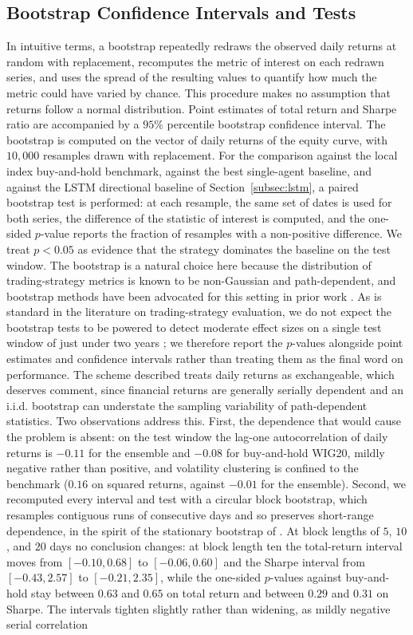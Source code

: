 \documentclass{ieeeaccess}
\newcommand{\TRtestCIlow}{\ensuremath{-0.10}}
\newcommand{\TRtestCIhigh}{\ensuremath{0.68}}
\newcommand{\ShtestCIlow}{\ensuremath{-0.43}}
\newcommand{\ShtestCIhigh}{\ensuremath{2.57}}
\begin{document}
\subsection{Bootstrap Confidence Intervals and Tests}
\label{subsec:bootstrap}

In intuitive terms, a bootstrap repeatedly redraws the observed daily returns at random with replacement, recomputes the metric of interest on each redrawn series, and uses the spread of the resulting values to quantify how much the metric could have varied by chance. This procedure makes no assumption that returns follow a normal distribution. Point estimates of total return and Sharpe ratio are accompanied by a $95\%$ percentile bootstrap confidence interval. The bootstrap is computed on the vector of daily returns of the equity curve, with $10{,}000$ resamples drawn with replacement. For the comparison against the local index buy-and-hold benchmark, against the best single-agent baseline, and against the LSTM directional baseline of Section~\ref{subsec:lstm}, a paired bootstrap test is performed: at each resample, the same set of dates is used for both series, the difference of the statistic of interest is computed, and the one-sided $p$-value reports the fraction of resamples with a non-positive difference. We treat $p < 0.05$ as evidence that the strategy dominates the baseline on the test window. The bootstrap is a natural choice here because the distribution of trading-strategy metrics is known to be non-Gaussian and path-dependent, and bootstrap methods have been advocated for this setting in prior work \cite{politis1994}. As is standard in the literature on trading-strategy evaluation, we do not expect the bootstrap tests to be powered to detect moderate effect sizes on a single test window of just under two years \cite{bailey2014}; we therefore report the $p$-values alongside point estimates and confidence intervals rather than treating them as the final word on performance. The scheme described treats daily returns as exchangeable, which deserves comment, since financial returns are generally serially dependent and an i.i.d. bootstrap can understate the sampling variability of path-dependent statistics. Two observations address this. First, the dependence that would cause the problem is absent: on the test window the lag-one autocorrelation of daily returns is $-0.11$ for the ensemble and $-0.08$ for buy-and-hold WIG20, mildly negative rather than positive, and volatility clustering is confined to the benchmark ($0.16$ on squared returns, against $-0.01$ for the ensemble). Second, we recomputed every interval and test with a circular block bootstrap, which resamples contiguous runs of consecutive days and so preserves short-range dependence, in the spirit of the stationary bootstrap of \cite{politis1994}. At block lengths of $5$, $10$, and $20$ days no conclusion changes: at block length ten the total-return interval moves from $[\TRtestCIlow, \TRtestCIhigh]$ to $[-0.06, 0.60]$ and the Sharpe interval from $[\ShtestCIlow, \ShtestCIhigh]$ to $[-0.21, 2.35]$, while the one-sided $p$-values against buy-and-hold stay between $0.63$ and $0.65$ on total return and between $0.29$ and $0.31$ on Sharpe. The intervals tighten slightly rather than widening, as mildly negative serial correlation 
\end{document}

